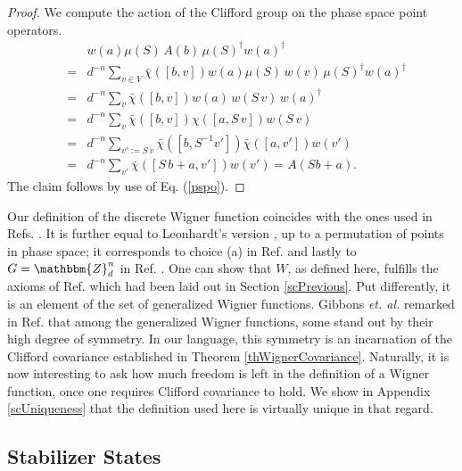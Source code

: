 \documentclass[aps,twocolumn,floatfix]{revtex4}
\def\ZZ{\mathbbm{Z}}
\begin{document}
\begin{proof}
	We compute the action of the Clifford group on the phase space point
	operators.
	\begin{eqnarray*}
		&&w(a)\mu(S)\,A(b)\,\mu(S)^\dagger w(a)^\dagger\\
		&=&
		d^{-n} \sum_{v\in V} \bar\chi([b,v])
		w(a)\mu(S)\,w(v)\,\mu(S)^\dagger w(a)^\dagger \\
		&=&
		d^{-n} \sum_{v} \bar\chi([b,v])
		w(a)\,w(S\,v)\,w(a)^\dagger \\
		&=& d^{-n} \sum_{v} \bar\chi([b,v])\chi([a,S\,v]) w(S\,v) \\
		&=& d^{-n} \sum_{v':=S\,v} \bar\chi([b,S^{-1}v'])\bar\chi([a,v']) w(v') \\
		&=& d^{-n} \sum_{v'} \bar\chi([S\,b+a,v']) w(v') 
		= A(Sb+a).
	\end{eqnarray*}
	The claim follows by use of Eq. (\ref{pspo}).
\end{proof}

Our definition of the discrete Wigner function coincides with the ones
used in Refs.  \cite{oldWootters,vourdas,villegar,diploma}. It is
further equal to Leonhardt's version \cite{leonhardt}, up to a
permutation of points in phase space; it corresponds to
choice (a) in Ref. \cite{klimov} and lastly to $G=\ZZ_d^n$ in Ref.
\cite{chaturvedi}.  One can show that $W$, as defined
here, fulfills the axioms of Ref.  \cite{wootters} which had been laid
out in Section \ref{scPrevious}. Put differently, it is an element of
the set of generalized Wigner functions. Gibbons \emph{et.  al.}
remarked in Ref. \cite{wootters} that among the generalized Wigner
functions, some stand out by their high degree of symmetry. In our
language, this symmetry is an incarnation of the Clifford covariance
established in Theorem \ref{thWignerCovariance}. Naturally, it is now
interesting to ask how much freedom is left in the definition of a
Wigner function, once one requires Clifford covariance to hold. We
show in Appendix \ref{scUniqueness} that the definition used here is
virtually unique in that regard.


\subsection{Stabilizer States}
\end{document}

